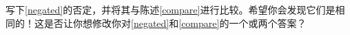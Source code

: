 \begin{enumerate}
\begin{enumerate}
    写下\ref{negated}的否定，并将其与陈述\ref{compare}进行比较。希望你会发现它们是相同的！这是否让你想修改你对\ref{negated}和\ref{compare}的一个或两个答案？
    \end{enumerate}
    
    \end{enumerate}
